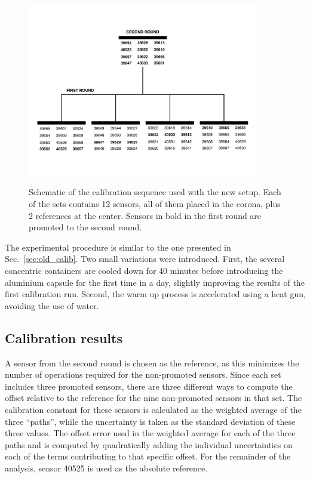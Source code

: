 \label{sec:newCalibrationStrategy}
\begin{figure}[htbp]
\centering
{\includegraphics[width=0.9\textwidth]{images/figure_18.pdf}}
\caption{Schematic of the calibration sequence used with the new setup. Each of the sets contains 12 sensors, all of them placed in the corona, plus 2 references at the center. Sensors in bold in the first round are promoted to the second round.}
\label{fig:newCalibrationStrategy}
\end{figure}

The experimental procedure is similar to the one presented in Sec.~\ref{sec:old_calib}. Two small variations were introduced. First, the several concentric containers are cooled down for 40 minutes before introducing the aluminium capsule for the first time in a day, slightly improving the results of the first calibration run. Second, the warm up process is accelerated using a heat gun, avoiding the use of water.

\subsection{Calibration results}
\label{sec:new_calib_results}

\noindent A sensor from the second round is chosen as the reference, as this minimizes the number of operations required for the non-promoted sensors. Since each set includes three promoted sensors, there are three different ways to compute the offset relative to the reference for the nine non-promoted sensors in that set. The calibration constant for these sensors is calculated as the weighted average of the three ``paths'', while the uncertainty is taken as the standard deviation of these three values. The offset error used in the weighted average for each of the three paths and is computed by quadratically adding the individual uncertainties on each of the terms contributing to that specific offset. For the remainder of the analysis, sensor 40525 is used as the absolute reference.

